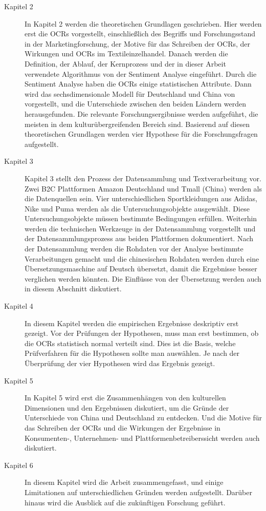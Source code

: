 \begin{description}
	\item[Kapitel 2] In Kapitel 2 werden die theoretischen Grundlagen geschrieben. Hier werden erst die \acl{OCRs} vorgestellt, einschließlich des Begriffs und Forschungsstand in der Marketingforschung, der Motive für das Schreiben der \acl{OCRs}, der Wirkungen und \acl{OCRs} im Textileinzelhandel. Danach werden die Definition, der Ablauf, der Kernprozess und der in dieser Arbeit verwendete Algorithmus von der Sentiment Analyse eingeführt. Durch die Sentiment Analyse haben die \acl{OCRs} einige statistischen Attribute. Dann wird das sechsdimensionale Modell für Deutschland und China von \citeauthor{hofstede2013interkulturelle} vorgestellt, und die Unterschiede zwischen den beiden Ländern werden herausgefunden. Die relevante Forschungsergibnisse werden aufgeführt, die meisten in dem kulturübergreifenden Bereich sind. Basierend auf diesen theoretischen Grundlagen werden vier Hypothese für die Forschungsfragen aufgestellt. 
	\item[Kapitel 3] Kapitel 3 stellt den Prozess der Datensammlung und Textverarbeitung vor. Zwei \ac{B2C} Plattformen Amazon Deutschland und Tmall (China) werden als die Datenquellen sein. Vier unterschiedlichen Sportkleidungen aus Adidas, Nike und Puma werden als die Untersuchungsobjekte ausgewählt. Diese Untersuchungsobjekte müssen bestimmte Bedingungen erfüllen. Weiterhin werden die technischen Werkzeuge in der Datensammlung vorgestellt und der Datensammlungsprozess aus beiden Plattformen dokumentiert. Nach der Datensammlung werden die Rohdaten vor der Analyse bestimmte Verarbeitungen gemacht und die chinesischen Rohdaten werden durch eine Übersetzungsmaschine auf Deutsch übersetzt, damit die Ergebnisse besser verglichen werden könnten. Die Einflüsse von der Übersetzung werden auch in diesem Abschnitt diskutiert.
	\item[Kapitel 4] In diesem Kapitel werden die empirischen Ergebnisse deskriptiv erst gezeigt. Vor der Prüfungen der Hypothesen, muss man erst bestimmen, ob die \acl{OCRs} statistisch normal verteilt sind. Dies ist die Basis, welche Prüfverfahren für die Hypothesen sollte man auswählen. Je nach der Überprüfung der vier Hypothesen wird das Ergebnis gezeigt.
	\item[Kapitel 5] In Kapitel 5 wird erst die Zusammenhängen von den kulturellen Dimensionen und den Ergebnissen diskutiert, um die Gründe der Unterschiede von China und Deutschland zu entdecken. Und die Motive für das Schreiben der \acl{OCRs} und die Wirkungen der Ergebnisse in Konsumenten-, Unternehmen- und Plattformenbetreiberssicht werden auch diskutiert.  
	\item[Kapitel 6] In diesem Kapitel wird die Arbeit zusammengefasst, und einige Limitationen auf unterschiedlichen Gründen werden aufgestellt. Darüber hinaus wird die Ausblick auf die zukünftigen Forschung geführt.
\end{description} 

